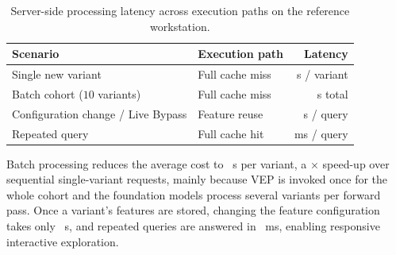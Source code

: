 \begin{table}[htbp]
    \centering
    \caption{Server-side processing latency across execution paths on the reference workstation.}
    \label{tab:latency_benchmarks}
    \begin{tabular}{llr}
        \toprule
        \textbf{Scenario} & \textbf{Execution path} & \textbf{Latency} \\
        \midrule
        Single new variant & Full cache miss & \tbd{} s / variant \\
        Batch cohort ($10$ variants) & Full cache miss & \tbd{} s total \\
        Configuration change / Live Bypass & Feature reuse & \tbd{} s / query \\
        Repeated query & Full cache hit & \tbd{} ms / query \\
        \bottomrule
    \end{tabular}
\end{table}

Batch processing reduces the average cost to \tbd{}~s per variant, a \tbd{}$\times$ speed-up over sequential single-variant requests, mainly because VEP is invoked once for the whole cohort and the foundation models process several variants per forward pass. Once a variant's features are stored, changing the feature configuration takes only \tbd{}~s, and repeated queries are answered in \tbd{}~ms, enabling responsive interactive exploration.

